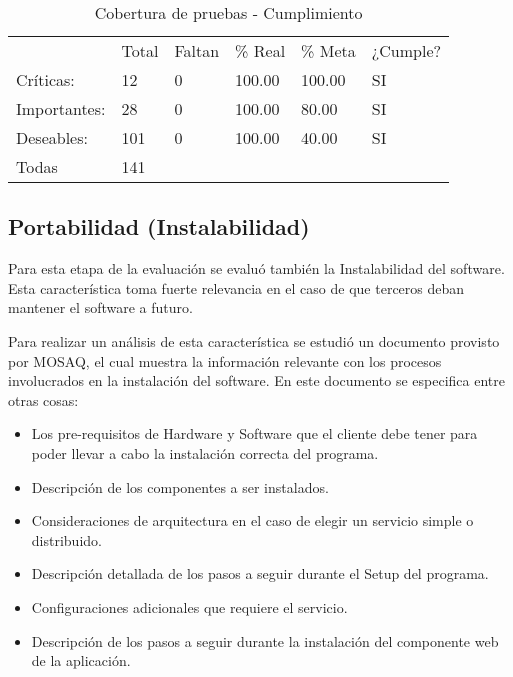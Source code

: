\begin{table}[hb]
\centering
    \begin{tabular}{llllll}
    ~               &  		Total &  		Faltan &  		\% Real &  		\% Meta & ¿Cumple? \\
     		Críticas:    &  		12    & 0         &  		100.00 &  		100.00 &  		SI    \\
     		Importantes: &  		28    & 0         &  		100.00 &  		80.00  &  		SI    \\
     		Deseables:   &  		101   & 0         &  		100.00 &  		40.00  &  		SI    \\
     		Todas        &  		141   & ~         & ~         & ~         & ~        \\ \hline
    \end{tabular}
         \caption{Cobertura de pruebas - Cumplimiento}
    \label{table:CBC}
\end{table}

\subsection{Portabilidad (Instalabilidad)}
\label{ins}
Para esta etapa de la evaluación se evaluó también la Instalabilidad del software.
Esta característica toma fuerte relevancia en el caso de que terceros deban mantener el software a futuro.

Para realizar un análisis de esta característica se estudió un documento provisto por MOSAQ, el cual
muestra la información relevante con los procesos involucrados en la instalación del software.
En este documento se especifica entre otras cosas:

\begin{itemize}
\item Los pre-requisitos de Hardware y Software que el cliente debe tener para poder llevar a cabo la instalación correcta del programa.
\item Descripción de los componentes a ser instalados.
\item Consideraciones de arquitectura en el caso de elegir un servicio simple o distribuido.
\item Descripción detallada de los pasos a seguir durante el Setup del programa.
\item Configuraciones adicionales que requiere el servicio.
\item Descripción de los pasos a seguir durante la instalación del componente web de la aplicación.
\end{itemize}

